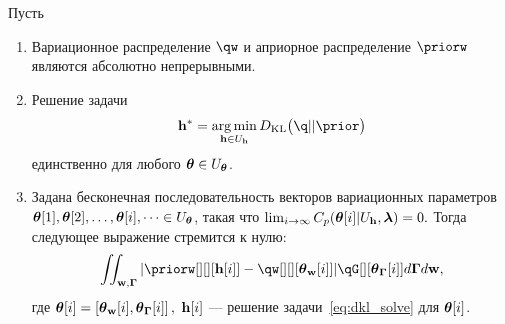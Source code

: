 


\begin{lemma}
\label{lem:pinsk}
Пусть
\begin{enumerate}
\item Вариационное распределение $\qw$ и априорное распределение $\priorw$  являются абсолютно непрерывными.

\item Решение задачи 
\begin{equation}
\label{eq:dkl_solve}
\h^{*} = \argmin_{\h \in \Uh} \KL{\q}{\prior}
\end{equation} единственно для любого $\boldsymbol{\theta} \in U_{\boldsymbol{\theta}}$.



\item Задана  бесконечная последовательность векторов вариационных параметров $\boldsymbol{\theta}[1],\boldsymbol{\theta}[2],\dots,\boldsymbol{\theta}[i],\dots \in U_{\boldsymbol{\theta}}$, такая что $\lim_{i \to \infty}C_p(\boldsymbol{\theta}[i]|U_{\mathbf{h}},\boldsymbol{\lambda}) = 0.$
Тогда следующее выражение стремится к нулю:
\[
 \iint_{\w,\G} |\priorw[][][{\h[i]}] - \qw[][][{\tetaw[i]}]| \qG[][{\tetaG[i]}] d\G d\w,
\]
где $\boldsymbol{\theta}[i] = \left[\boldsymbol{\theta}_\mathbf{w}[i], \boldsymbol{\theta}_{\boldsymbol{\Gamma}}[i]\right],$ $\mathbf{h}[i]$ --- решение задачи~\eqref{eq:dkl_solve} для $\boldsymbol{\theta}[i]$.

\end{enumerate}
\end{lemma}
